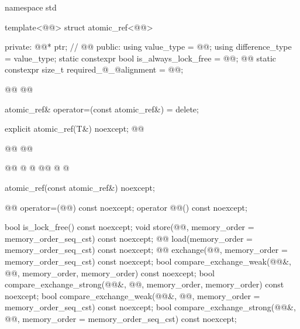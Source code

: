 \begin{codeblock}
namespace std {
  template<@@> struct atomic_ref<@@> {
  private:
    @@* ptr;        // \expos
    @@
  public:
    using value_type = @@;
    using difference_type = value_type;
    static constexpr bool is_always_lock_free = @@;
    @@
    static constexpr size_t required_@_@alignment = @@;

    @@
    @@

    atomic_ref& operator=(const atomic_ref&) = delete;

    explicit atomic_ref(T&) noexcept;
    @@
    
    @@
    @@
    
    @@
    @  @
    @@
    @  @

    atomic_ref(const atomic_ref&) noexcept;

    @@ operator=(@@) const noexcept;
    operator @@() const noexcept;

    bool is_lock_free() const noexcept;
    void store(@@, memory_order = memory_order_seq_cst) const noexcept;
    @@ load(memory_order = memory_order_seq_cst) const noexcept;
    @@ exchange(@@,
                      memory_order = memory_order_seq_cst) const noexcept;
    bool compare_exchange_weak(@@&, @@,
                               memory_order, memory_order) const noexcept;
    bool compare_exchange_strong(@@&, @@,
                                 memory_order, memory_order) const noexcept;
    bool compare_exchange_weak(@@&, @@,
                               memory_order = memory_order_seq_cst) const noexcept;
    bool compare_exchange_strong(@@&, @@,
                                 memory_order = memory_order_seq_cst) const noexcept;

}}
\end{codeblock}
